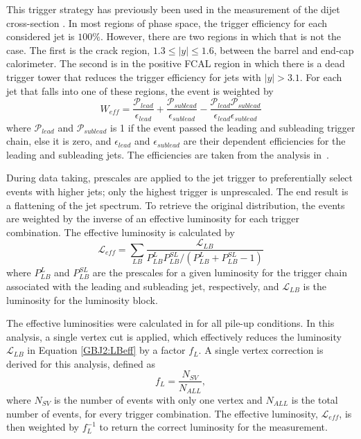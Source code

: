 This trigger strategy has previously been used in the measurement of the dijet cross-section \cite{ref:Dijet}.
In most regions of phase space, the trigger efficiency for each considered jet is $100\%$.
However, there are two regions in which that is not the case.
The first is the crack region, $1.3\le|y|\le1.6$, between the barrel and end-cap calorimeter.
The second is in the positive FCAL region in which there is a dead trigger tower that reduces the trigger efficiency for jets with $|y|>3.1$.
For each jet that falls into one of these regions, the event is weighted by 
\begin{equation}
W_{eff}= \frac{\mathcal{P}_{lead}}{\epsilon_{lead}} + \frac{\mathcal{P}_{sublead}}{\epsilon_{sublead}} -\frac{\mathcal{P}_{lead}\mathcal{P}_{sublead}}{\epsilon_{lead}\epsilon_{sublead}}
\label{GBJ2:Eff}
\end{equation}
where $\mathcal{P}_{lead}$ and $\mathcal{P}_{sublead}$ is 1 if the event passed the leading and subleading trigger chain, else it is zero, and $\epsilon_{lead}$ and $\epsilon_{sublead}$ are their \pt{} dependent efficiencies for the leading and subleading jets.
The efficiencies are taken from the analysis in~\cite{ref:Dijet}.

During data taking, prescales are applied to the jet trigger to preferentially select events with higher \pt{} jets; only the highest \pt{} trigger is unprescaled.
The end result is a flattening of the jet \pt{} spectrum.
To retrieve the original distribution, the events are weighted by the inverse of an effective luminosity for each trigger combination.
The effective luminosity is calculated by
\begin{equation}
\mathcal{L}_{eff} = \sum_{LB} \frac{\mathcal{L}_{LB}}{P_{LB}^L P_{LB}^{SL}/(P_{LB}^L + P_{LB}^{SL} -1)}
\label{GBJ2:LBeff}
\end{equation}
where $P_{LB}^L$ and $P_{LB}^{SL}$ are the prescales for a given luminosity for the trigger chain associated with the leading and subleading jet, respectively, and $\mathcal{L}_{LB}$ is the luminosity for the luminosity block. 

The effective luminosities were calculated in \cite{ref:Dijet} for all pile-up conditions.
In this analysis, a single vertex cut is applied, which effectively reduces the luminosity $\mathcal{L}_{LB}$ in Equation \ref{GBJ2:LBeff} by a factor $f_{L}$.
A single vertex correction is derived for this analysis, defined as 
\begin{equation}
 f_{L} = \frac{N_{SV}}{N_{ALL}},
\label{GBJ2:SVCorrection}
\end{equation}
where $N_{SV}$ is the number of events with only one vertex and  $N_{ALL}$ is the total number of events, for every trigger combination.
The effective luminosity, $\mathcal{L}_{eff}$, is then weighted by $f_{L}^{-1}$ to return the correct luminosity for the measurement.

